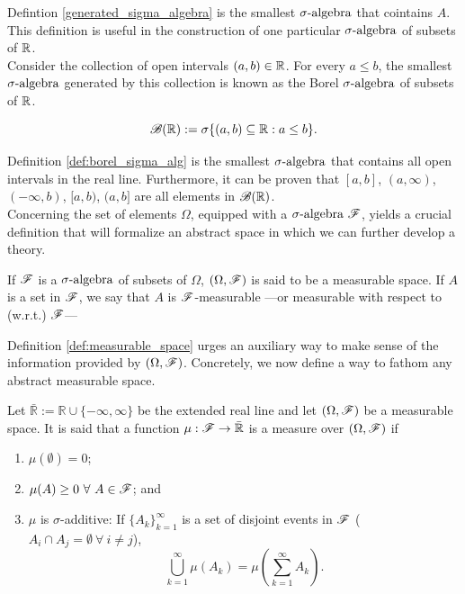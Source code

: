 \documentclass[../TGMAFFIRO.tex]{subfiles}
\begin{document}
Defintion \ref{generated_sigma_algebra} is the smallest $\sigma\text{-algebra}$ that cointains $A$. This definition is useful in the construction of one particular $\sigma\text{-algebra}$ of subsets of $\mathbb{R}$.\\

Consider the collection of open intervals $(a,b) \in \mathbb{R}$. For every $a \leq b$, the smallest $\sigma\text{-algebra}$ generated by this collection is known as the Borel $\sigma\text{-algebra}$ of subsets of $\mathbb{R}$.

\begin{definition}\label{def:borel_sigma_alg}
		\begin{equation}
			\mathscr{B}(\mathbb{R}) := \sigma\{(a,b) \subseteq \mathbb{R}:a\leq b\}.
		\end{equation}
\end{definition}

Definition \ref{def:borel_sigma_alg} is the smallest $\sigma\text{-algebra}$ that contains all open intervals in the real line. Furthermore, it can be proven that $[a, b]$, $(a,\infty)$, $(-\infty, b)$, $[a, b)$, $(a, b]$ are all elements in $\mathscr{B}(\mathbb{R})$.\\

Concerning the set of elements $\Omega$, equipped with a $\sigma\text{-algebra} \ \mathscr{F}$, yields a crucial definition that will formalize an abstract space in which we can further develop a theory.

\begin{definition} \label{def:measurable_space}
	If $\mathscr{F}$ is a $\sigma\text{-algebra}$ of subsets of $\Omega$, $(\Omega, \mathscr{F})$ is said to be a measurable space. If $A$ is a set in $\mathscr{F}$, we say that $A$ is $\mathscr{F}$-measurable ---or measurable with respect to (w.r.t.) $\mathscr{F}$---
\end{definition}

Definition \ref{def:measurable_space} urges an auxiliary way to make sense of the information provided by $(\Omega, \mathscr{F})$. Concretely, we now define a way to fathom any abstract measurable space.

\begin{definition}
	Let $\bar{\mathbb R} := \mathbb R \cup \{-\infty, \infty\}$ be the extended real line and let $(\Omega, \mathscr{F})$ be a measurable space. It is said that a function $\mu: \mathscr{F} \rightarrow \bar{\mathbb R}$ is a measure over $(\Omega, \mathscr{F})$ if
	\begin{enumerate}
		\item $\mu(\emptyset) = 0$;
		\item $\mu(A) \geq 0\ \forall \ A \in \mathscr{F} $; and
		\item $\mu$ is $\sigma$-additive: If $\{A_k\}_{k=1}^{\infty}$ is a set of disjoint events in $\mathscr{F}$ ($A_i \cap A_j = \emptyset \ \forall \ i \neq j$), 
		\begin{equation*}
			\bigcup_{k=1}^{\infty} \mu(A_k) = \mu(\sum_{k=1}^{\infty} A_k).
		\end{equation*}
	\end{enumerate}
\end{definition}
\end{document}

